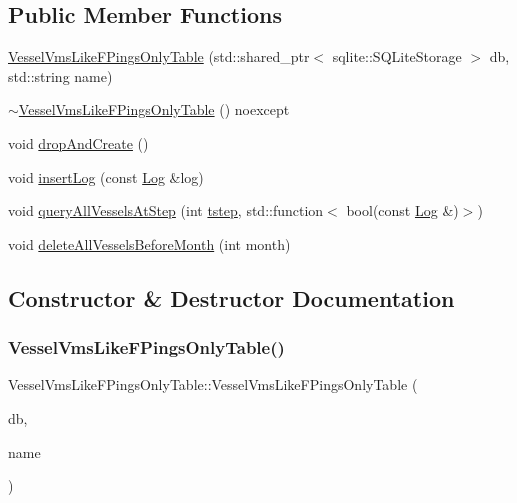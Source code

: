 \subsection*{Public Member Functions}
\begin{DoxyCompactItemize}
\item 
\mbox{\hyperlink{class_vessel_vms_like_f_pings_only_table_a7dad37c90f4caaf6af13be6eda2a32d3}{Vessel\+Vms\+Like\+F\+Pings\+Only\+Table}} (std\+::shared\+\_\+ptr$<$ sqlite\+::\+S\+Q\+Lite\+Storage $>$ db, std\+::string name)
\item 
\mbox{\hyperlink{class_vessel_vms_like_f_pings_only_table_aae5789ca6afe67c97c4c0d1d3e99ed87}{$\sim$\+Vessel\+Vms\+Like\+F\+Pings\+Only\+Table}} () noexcept
\item 
void \mbox{\hyperlink{class_vessel_vms_like_f_pings_only_table_a5ddd7a3e56f338cdb8a735b9bd219679}{drop\+And\+Create}} ()
\item 
void \mbox{\hyperlink{class_vessel_vms_like_f_pings_only_table_aa320f841cb6c3b1cfcf7a44c6cc80382}{insert\+Log}} (const \mbox{\hyperlink{struct_vessel_vms_like_f_pings_only_table_1_1_log}{Log}} \&log)
\item 
void \mbox{\hyperlink{class_vessel_vms_like_f_pings_only_table_aafe4870a8bc05728b97403eb7fb5f982}{query\+All\+Vessels\+At\+Step}} (int \mbox{\hyperlink{thread__vessels_8cpp_a84bc73d278de929ec9974e1a95d9b23a}{tstep}}, std\+::function$<$ bool(const \mbox{\hyperlink{struct_vessel_vms_like_f_pings_only_table_1_1_log}{Log}} \&)$>$)
\item 
void \mbox{\hyperlink{class_vessel_vms_like_f_pings_only_table_a7a8c5021c531c7d8e1ca54a2656f0bfe}{delete\+All\+Vessels\+Before\+Month}} (int month)
\end{DoxyCompactItemize}


\subsection{Constructor \& Destructor Documentation}
\mbox{\label{class_vessel_vms_like_f_pings_only_table_a7dad37c90f4caaf6af13be6eda2a32d3}} 
\subsubsection{\texorpdfstring{VesselVmsLikeFPingsOnlyTable()}{VesselVmsLikeFPingsOnlyTable()}}
{\footnotesize\ttfamily Vessel\+Vms\+Like\+F\+Pings\+Only\+Table\+::\+Vessel\+Vms\+Like\+F\+Pings\+Only\+Table (\begin{DoxyParamCaption}\item[{std\+::shared\+\_\+ptr$<$ sqlite\+::\+S\+Q\+Lite\+Storage $>$}]{db,  }\item[{std\+::string}]{name }\end{DoxyParamCaption})}

